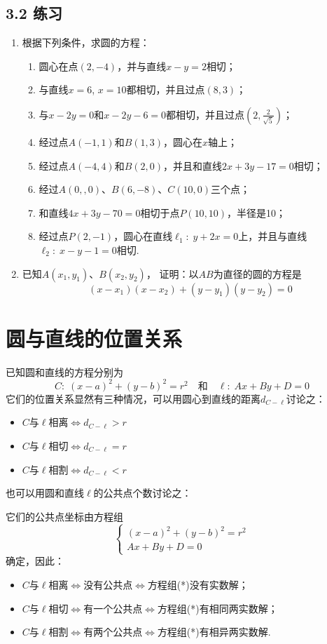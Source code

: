 \subsection*{3.2 练习}
\begin{enumerate}
    \item 根据下列条件，求圆的方程：
\begin{enumerate}[(1)]
\item 圆心在点$(2,-4)$，并与直线$x-y=2$相切；
\item 与直线$x=6$, $x=10$都相切，并且过点$(8,3)$；
\item 与$x-2y=0$和$x-2y-6=0$都相切，并且过点$\left(2,\frac{2}{\sqrt{5}}\right)$；
\item 经过点$A(-1,1)$和$B(1,3)$，圆心在$x$轴上；
\item 经过点$A(-4,4)$和$B(2,0)$，并且和直线$2x+3y-17=0$相切；
\item 经过$A(0,,0)$、$B(6,-8)$、$C(10,0)$三个点；
\item 和直线$4x+3y-70=0$相切于点$P(10,10)$，半径是10；
\item 经过点$P(2,-1)$，圆心在直线$\ell_1:\; y+2x=0$上，并且与直线$\ell_2:\; x-y-1=0$相切.   
\end{enumerate}

\item  已知$A(x_1,y_1)$、$B(x_2,y_2)$，
证明：以$AB$为直径的圆的方程是$$(x-x_1)(x-x_2)+(y-y_1)(y-y_2)=0$$
\end{enumerate}

\section{圆与直线的位置关系}
已知圆和直线的方程分别为
\[C:\; (x-a)^2+(y-b)^2=r^2\quad \text{和}\quad \ell:\; Ax+By+D=0\]
它们的位置关系显然有三种情况，可以用圆心到直线的距离$d_{C-\ell}$讨论之：
\begin{itemize}
    \item $C$与$\ell$相离$\Longleftrightarrow d_{C-\ell}>r$
    \item $C$与$\ell$相切$\Longleftrightarrow d_{C-\ell}=r$
    \item $C$与$\ell$相割$\Longleftrightarrow d_{C-\ell}<r$
\end{itemize}
也可以用圆和直线$\ell$的公共点个数讨论之：

它们的公共点坐标由方程组
\begin{equation}
    \begin{cases}
        (x-a)^2+(y-b)^2=r^2\\
        Ax+By+D=0
    \end{cases}\tag{*}
\end{equation}
确定，因此：
\begin{itemize}
    \item $C$与$\ell$相离$\Longleftrightarrow$没有公共点$\Longleftrightarrow$方程组(*)没有实数解；
    \item $C$与$\ell$相切$\Longleftrightarrow$有一个公共点$\Longleftrightarrow$方程组(*)有相同两实数解；
    \item  $C$与$\ell$相割$\Longleftrightarrow$有两个公共点$\Longleftrightarrow$方程组(*)有相异两实数解.
\end{itemize}

